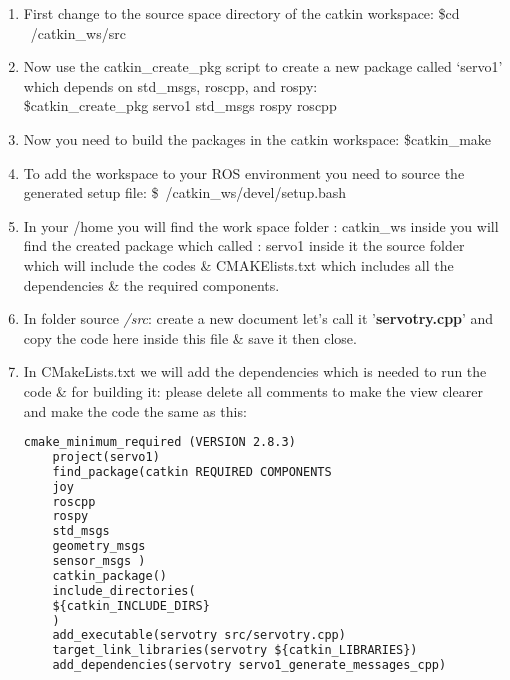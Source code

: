  \begin{enumerate}
 	\item First change to the source space directory of the catkin workspace: \$cd ~/catkin_ws/src
 	\item Now use the catkin\_create\_pkg script to create a new package called ‘servo1’ which depends on std\_msgs, roscpp, and rospy:\\
 	 \$catkin\_create\_pkg servo1 std\_msgs rospy roscpp
 	\item Now you need to build the packages in the catkin workspace: \$catkin\_make
 	\item To add the workspace to your ROS environment you need to source the generated setup file: \$~/catkin_ws/devel/setup.bash
 	\item In your /home you will find the work space folder : catkin\_ws inside you will find the created package which called : servo1 inside it the source folder which will include the codes \& CMAKElists.txt which includes all the dependencies \& the required components.
 	\item In folder source \textit{/src}: create a new document let's call it '\textbf{servotry.cpp}' and copy the code here inside this file \& save it then close.
 	\item In CMakeLists.txt we will add the dependencies which is needed to run the code \& for building it: please delete all comments to make the view clearer and make the code the same as this: 
 	\begin{lstlisting}[language=XML]
 	cmake_minimum_required (VERSION 2.8.3) 
 	project(servo1)
 	find_package(catkin REQUIRED COMPONENTS
 	joy
 	roscpp
 	rospy
 	std_msgs
 	geometry_msgs
 	sensor_msgs )
 	catkin_package()
 	include_directories(
 	${catkin_INCLUDE_DIRS}
 	)
 	add_executable(servotry src/servotry.cpp)
 	target_link_libraries(servotry ${catkin_LIBRARIES})
 	add_dependencies(servotry servo1_generate_messages_cpp)
    \end{lstlisting}
    

\end{enumerate}
